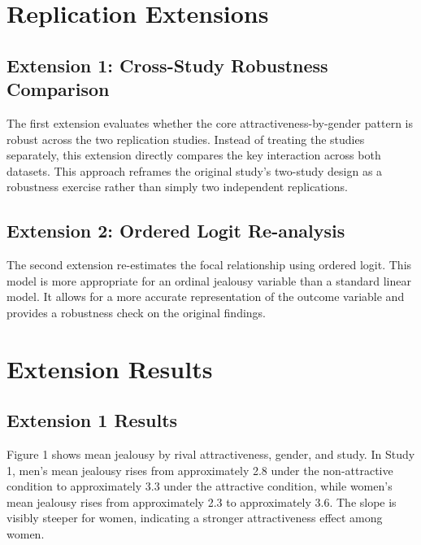 \documentclass[12pt]{article}
\begin{document}
	\vspace{10cm}
	\section{Replication Extensions}
	
	\subsection{Extension 1: Cross-Study Robustness Comparison}
	The first extension evaluates whether the core attractiveness-by-gender pattern is robust across the two replication studies. Instead of treating the studies separately, this extension directly compares the key interaction across both datasets. This approach reframes the original study’s two-study design as a robustness exercise rather than simply two independent replications.
	
	 
	
	\subsection{Extension 2: Ordered Logit Re-analysis}
	The second extension re-estimates the focal relationship using ordered logit. This model is more appropriate for an ordinal jealousy variable than a standard linear model. It allows for a more accurate representation of the outcome variable and provides a robustness check on the original findings.
	
		 
	
	\section{Extension Results}
	
	\subsection{Extension 1 Results}
	Figure 1 shows mean jealousy by rival attractiveness, gender, and study. In Study 1, men’s mean jealousy rises from approximately 2.8 under the non-attractive condition to approximately 3.3 under the attractive condition, while women’s mean jealousy rises from approximately 2.3 to approximately 3.6. The slope is visibly steeper for women, indicating a stronger attractiveness effect among women.
	
\end{document}
